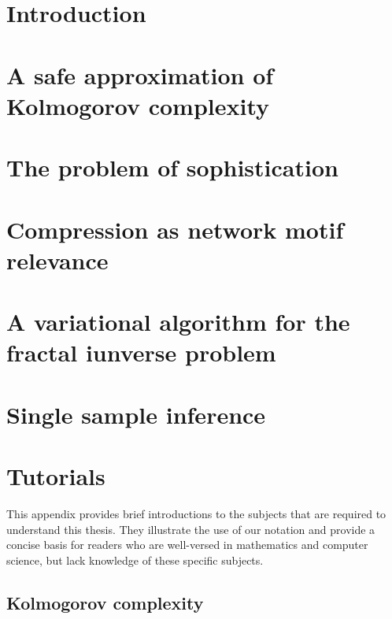 \documentclass{thesis}
\theoremstyle{definition}
\begin{document}
\chapter{Introduction}



\chapter{A safe approximation of Kolmogorov complexity}



\chapter{The problem of sophistication}



\chapter{Compression as network motif relevance}



\chapter{A variational algorithm for the fractal iunverse problem}



\chapter{Single sample inference}






\appendix 
\chapter{Tutorials}
\begin{summary}
This appendix provides brief introductions to the subjects that are required to understand this thesis. They illustrate the use of our notation and provide a concise basis for readers who are well-versed in mathematics and computer science, but lack knowledge of these specific subjects. 
\end{summary}

\section{Kolmogorov complexity}
\end{document}
